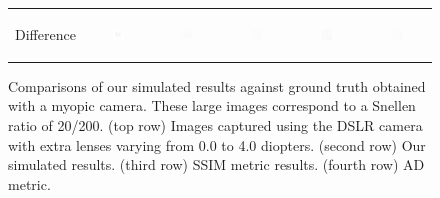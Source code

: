\begin{figure}[!b]
\begin{tabular}{@{}r@{ } c@{ } c@{ } c@{ } c@{ } c }
	\begin{sideways} \parbox[b]{20mm} {Difference} \end{sideways} &
	\includegraphics[width=0.185\textwidth]{__Images/05/WB_N(20-200)_+0D_to_+4D/wb_N_20-200_Camera+0,00D(diff).png} &
	\includegraphics[width=0.185\textwidth]{__Images/05/WB_N(20-200)_+0D_to_+4D/wb_N_20-200_Camera+1,00D(diff).png} &
	\includegraphics[width=0.185\textwidth]{__Images/05/WB_N(20-200)_+0D_to_+4D/wb_N_20-200_Camera+2,00D(diff).png} &
	\includegraphics[width=0.185\textwidth]{__Images/05/WB_N(20-200)_+0D_to_+4D/wb_N_20-200_Camera+3,00D(diff).png} &
	\includegraphics[width=0.185\textwidth]{__Images/05/WB_N(20-200)_+0D_to_+4D/wb_N_20-200_Camera+4,00D(diff).png} \\
 
	\end{tabular}
	
	\caption[Comparisons of our simulated results against ground truth obtained with a myopic camera.]{Comparisons of our simulated results against ground truth obtained with a myopic camera. These large images correspond to a Snellen ratio of 20/200. (top row) Images captured using the DSLR camera with extra lenses varying from 0.0 to 4.0 diopters. (second row) Our simulated results. (third row) SSIM metric results. (fourth row) AD metric.}
	\label{fig:comparison_myopic_wb}
\end{figure}